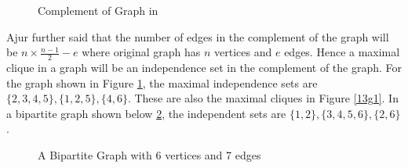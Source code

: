 \begin{figure}
\begin{center}
\caption{ Complement of Graph in \label{13g1}}\label{13g2}
\end{center}
\end{figure}

Ajur further said that the number of edges in the complement of the graph will be $n\times\frac{n-1}{2}-e$ where original graph has $n$ vertices and $e$ edges. Hence a maximal clique in a graph will be an independence set in the complement of the graph. For the graph shown in Figure \ref{13g2}, the maximal independence sets are $\{2,3,4,5\}, \{1,2,5\} , \{4,6\}$. These are also the maximal cliques in Figure \ref{13g1}. In a bipartite graph shown below \ref{13g3}, the independent sets are $\{1,2\}, \{3,4,5,6\}, \{2,6\}$.
\begin{figure}
\begin{center}
\caption{ A Bipartite Graph with 6 vertices and 7 edges}\label{13g3}
\end{center}
\end{figure}
